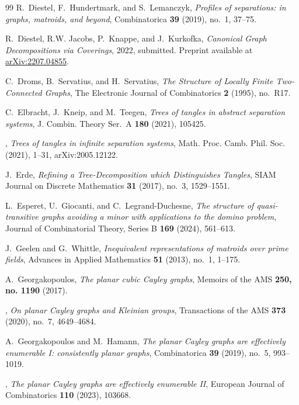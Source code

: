 \documentclass{aic}
\theoremstyle{plain}
\theoremstyle{definition}
\theoremstyle{plain}
\theoremstyle{plain}
\begin{document}
\begin{thebibliography}{99}
R.~Diestel, F.~Hundertmark, and S.~Lemanczyk, \emph{Profiles of separations: in
  graphs, matroids, and beyond}, Combinatorica \textbf{39} (2019), no.~1,
  37--75.

R.~Diestel, R.W. Jacobs, P.~Knappe, and J.~Kurkofka, \emph{Canonical {G}raph
  {D}ecompositions via {C}overings}, 2022, submitted. Preprint available at
  \href{https://arxiv.org/abs/2207.04855}{arXiv:2207.04855}.

C.~Droms, B.~Servatius, and H.~Servatius, \emph{The {S}tructure of {L}ocally
  {F}inite {T}wo-{C}onnected {G}raphs}, The Electronic Journal of Combinatorics
  \textbf{2} (1995), no.~R17.

C.~Elbracht, J.~Kneip, and M.~Teegen, \emph{Trees of tangles in abstract
  separation systems}, J. Combin. Theory Ser.~A \textbf{180} (2021), 105425.

\bysame, \emph{Trees of tangles in infinite separation systems}, Math. Proc.
  Camb. Phil. Soc. (2021), 1--31, arXiv:2005.12122.

J.~Erde, \emph{Refining a {T}ree-{D}ecomposition which {D}istinguishes
  {T}angles}, SIAM Journal on Discrete Mathematics \textbf{31} (2017), no.~3,
  1529--1551.

L.~Esperet, U.~Giocanti, and C.~Legrand-Duchesne, \emph{The structure of
  quasi-transitive graphs avoiding a minor with applications to the domino
  problem}, Journal of Combinatorial Theory, Series B \textbf{169} (2024),
  561--613.

J.~Geelen and G.~Whittle, \emph{Inequivalent representations of matroids over
  prime fields}, Advances in Applied Mathematics \textbf{51} (2013), no.~1,
  1--175.

A.~Georgakopoulos, \emph{The planar cubic {C}ayley graphs}, Memoirs of the AMS
  \textbf{250, no. 1190} (2017).

\bysame, \emph{On planar {C}ayley graphs and {K}leinian groups}, Transactions
  of the AMS \textbf{373} (2020), no.~7, 4649--4684.

A.~Georgakopoulos and M.~Hamann, \emph{The planar {C}ayley graphs are
  effectively enumerable {I}: consistently planar graphs}, Combinatorica
  \textbf{39} (2019), no.~5, 993--1019.

\bysame, \emph{The planar {C}ayley graphs are effectively enumerable {II}},
  European Journal of Combinatorics \textbf{110} (2023), 103668.


\end{thebibliography}
\end{document}
